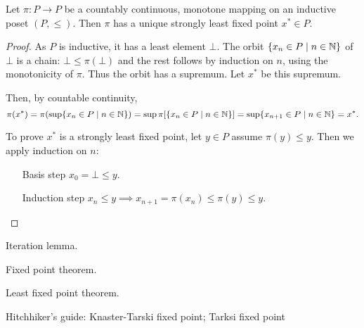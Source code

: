 \begin{theorem}
Let $\pi:P\to P$ be a countably continuous, monotone mapping on an inductive poset $(P,\leq)$. Then $\pi$ has a unique strongly least fixed point $x^*\in P$.
\end{theorem}
\begin{proof}
As $P$ is inductive, it has a least element $\bot$. The orbit $\{x_n\in P\;|\; n\in \mathbb{N}\}$ of $\bot$ is a chain: $\bot \leq \pi(\bot)$ and the rest follows by induction on $n$, using the monotonicity of $\pi$. Thus the orbit has a supremum. Let $x^*$ be this supremum.

Then, by countable continuity,
\[ \pi(x^*) = \pi(\sup\{x_n\in P\;|\; n\in \mathbb{N}\}) = \sup\pi[\{x_n\in P\;|\; n\in \mathbb{N}\}] = \sup\{x_{n+1}\in P\;|\; n\in \mathbb{N}\} = x^*. \]

To prove $x^*$ is a strongly least fixed point, let $y\in P$ assume $\pi(y)\leq y$. Then we apply induction on $n$:
\begin{itemize}[leftmargin=3cm]
\item[Basis step] $x_0 = \bot \leq y$.
\item[Induction step] $x_n \leq y \implies x_{n+1} = \pi(x_n)\leq \pi(y) \leq y$.
\end{itemize}
\end{proof}

Iteration lemma.

Fixed point theorem.

Least fixed point theorem.

Hitchhiker's guide:
Knaster-Tarski fixed point; Tarksi fixed point

